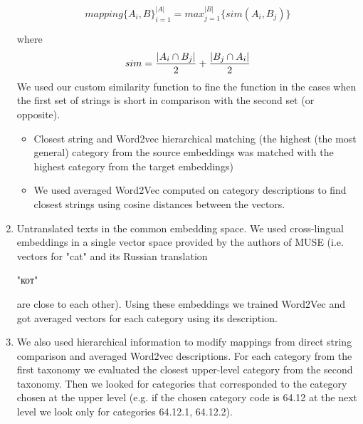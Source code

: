 \documentclass[conference]{IEEEtran}
\begin{document}
\begin{enumerate}
$$mapping\{A_i, B\}_{i=1}^{|A|} = max_{j=1}^{|B|}\{sim(A_i,B_j)\}$$

where $$sim = \dfrac{|A_i \cap B_j|}{2} + \\ \dfrac{|B_j \cap A_i|}{2} $$
We used our custom similarity function to fine the function in the cases when the first set of strings is short in comparison with the second set (or opposite).
\begin{itemize}
\item Closest string and Word2vec hierarchical matching (the highest (the most general) category from the source embeddings was matched with the highest category from the target embeddings)
\item We used averaged Word2Vec computed on category descriptions  to find closest strings using cosine distances between the vectors.
\end{itemize}
\item Untranslated texts in the common embedding space.
We used cross-lingual embeddings in a single vector space provided by the authors of MUSE (i.e. vectors for "cat" and its Russian translation \begin{russian}"кот"\end{russian} are close to each other). Using these embeddings we trained Word2Vec and got averaged vectors for each category using its description.
\item We also used hierarchical information to modify mappings from direct string comparison and averaged Word2vec descriptions. For each category from the first taxonomy we evaluated the closest upper-level category from the second taxonomy. Then we looked for categories that corresponded to the category chosen at the upper level (e.g. if the chosen category code is 64.12 at the next level we look only for categories 64.12.1, 64.12.2).
\end{enumerate}
\end{document}
